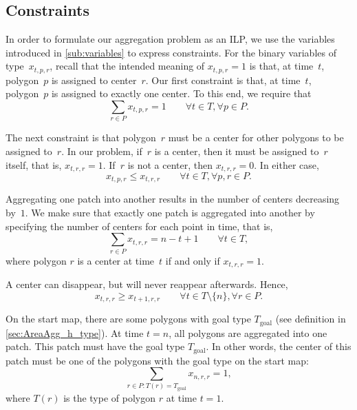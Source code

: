 \subsection{Constraints}

In order to formulate our aggregation problem as an ILP, we use the
variables introduced in \sect\ref{sub:variables} to express 
constraints.
For the binary variables of type~$x_{t,p,r}$, recall that the intended
meaning of $x_{t,p,r}=1$ is that, at
time~$t$, polygon~$p$ is assigned to center~$r$. 
Our first constraint is that, at time~$t$, polygon~$p$ is assigned to 
exactly one center. To this end, we require 
that
\begin{equation}
\label{eq:CstrOneCenter}
\sum_{r\in P} x_{t,p,r}=1 \qquad
\forall t \in {T}, \forall p \in P.
\end{equation}

The next constraint is that polygon~$r$ must be a center
for other polygons to be assigned to~$r$.
In our problem, if~$r$ is a center, 
then it must be assigned to~$r$ itself,
that is, $x_{t,r,r}=1$.
If~$r$ is not a center, then $x_{t,r,r}=0$.
In either case,
\begin{equation}
\label{eq:CstrAssign}
x_{t,p,r} \leq x_{t,r,r} \qquad
\forall t \in {T}, \forall  p, r \in P.
\end{equation}

Aggregating one patch into another results in 
the number of centers decreasing by~$1$.
We make sure that exactly one patch 
is aggregated into another by 
specifying the number of centers
for each point in time, that is,
\begin{equation}
\label{eq:CstrCountCenter}
\sum_{r\in P} x_{t,r,r}=n-t+1 \qquad
\forall t \in {T},
\end{equation}
where polygon $r$ is a center at time~$t$ if and only if 
$x_{t,r,r}=1$.

A center can disappear, but will never reappear afterwards.
Hence,
\begin{equation}
\label{eq:CstrNoReappear}
x_{t,r,r} \geq x_{t+1,r,r} \qquad 
\forall t \in {T}\setminus \{n\},
\forall r \in P.
\end{equation}


On the start map, 
there are some polygons with  goal type $T_\mathrm{goal}$
(see definition in \sect\ref{sec:AreaAgg_h_type}).
At time $t=n$, all polygons are aggregated into one patch.
This patch must have the goal type $T_\mathrm{goal}$.
In other words, the center of this patch must be one of the 
polygons with the 
goal type on the start map:
\begin{equation}
\label{eq:CstrType}
\sum_{r\in P \colon T(r)=T_\mathrm{goal}} x_{n,r,r}=1,
\end{equation}
where $T(r)$ is the type of polygon $r$ at time $t=1$.

